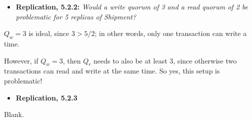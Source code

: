 \begin{itemize}
  \item \textbf{Replication, 5.2.2:}
        \textit{Would a write quorum of 3 and a read quorum of 2 be problematic
        for 5 replicas of Shipment?}
\end{itemize}

$Q_w = 3$ is ideal, since $3 > 5/2$; in other words, only one
transaction can write a time. \smallskip

However, if $Q_w = 3$, then $Q_r$ needs to also be at least 3, since otherwise
two transactions can read and write at the same time. So yes, this setup is
problematic!


\begin{itemize}
  \item \textbf{Replication, 5.2.3}
\end{itemize}

Blank.

\Sectend
